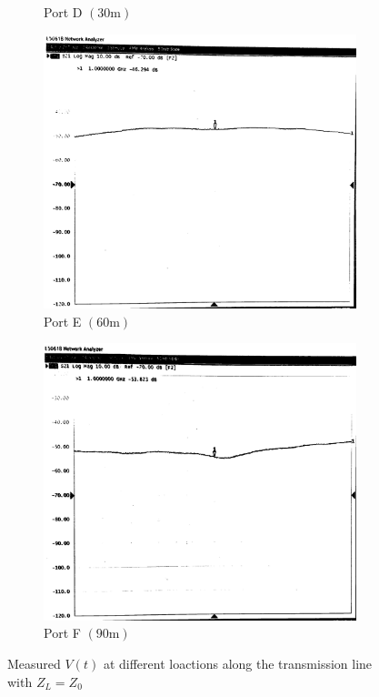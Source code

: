 \documentclass[10pt]{article}
\begin{document}
\begin{figure}[ht]
\begin{subfigure}[b]{0.45\textwidth}
        \caption{Port D $(30\text{m})$}
    \end{subfigure}
    \begin{subfigure}[b]{0.45\textwidth}
        \includegraphics[width=\textwidth]{../photos/lab2/unkwn-load-peak.jpg}
        \caption{Port E $(60\text{m})$}
    \end{subfigure}
    \quad
    \begin{subfigure}[b]{0.45\textwidth}
        \includegraphics[width=\textwidth]{../photos/lab2/unkwn-load-valley.jpg}
        \caption{Port F $(90\text{m})$}
    \end{subfigure}
    \caption{Measured $V(t)$ at different loactions along the transmission line with $Z_L = Z_0$ \vspace{-0.5cm}}
    \label{v_t_matched_tline}
\end{figure}
\end{document}
